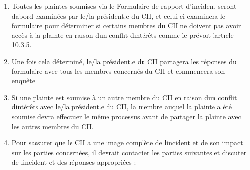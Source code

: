 \begin{enumerate}
 \item
  Toutes les plaintes soumises via le Formulaire de rapport d'incident seront d\textquotesingle abord examinées par le/la président.e du CII, et celui-ci examinera le formulaire pour déterminer si certains membres du CII ne doivent pas avoir accès à la plainte en raison d\textquotesingle un conflit d\textquotesingle intérêts comme le prévoit l\textquotesingle article 10.3.5.
 \item
  Une fois cela déterminé, le/la président.e du CII partagera les réponses du formulaire avec tous les membres concernés du CII et commencera son enquête.
 \item
  Si une plainte est soumise à un autre membre du CII en raison d\textquotesingle un conflit d\textquotesingle intérêts avec le/la président.e du CII, la membre auquel la plainte a été soumise devra effectuer le même processus avant de partager la plainte avec les autres membres du CII.
 \item
  Pour s\textquotesingle assurer que le CII a une image complète de l\textquotesingle incident et de son impact sur les parties concernées, il devrait contacter les parties suivantes et discuter de l\textquotesingle incident et des réponses appropriées :


\end{enumerate}
